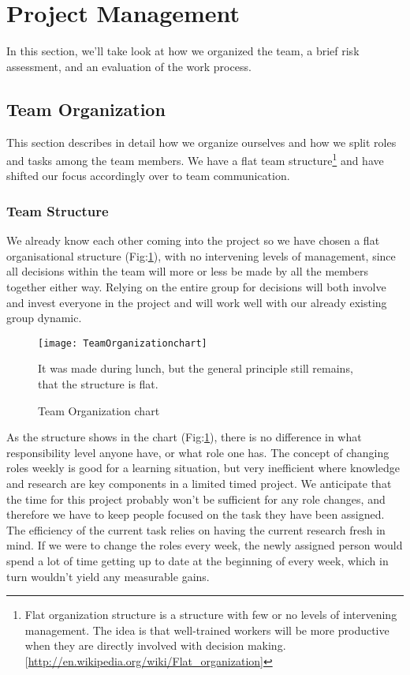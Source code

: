 \section{Project Management}\label{Project Management} 
    In this section, we'll take look at how we organized the team, a brief risk assessment, and an evaluation of the work process. 
    
    \subsection{Team Organization}\label{Team Organization} 
        This section describes in detail how we organize ourselves and how we split roles and tasks among the team members. We have a flat team structure\footnote{Flat organization structure is a structure with few or no levels of intervening management. The idea is that well-trained workers will be more productive when they are directly involved with decision making. [\url{http://en.wikipedia.org/wiki/Flat_organization}]}  and have shifted our focus accordingly over to team communication. 
    
    \subsubsection{Team Structure}\label{Team Structure}
    We already know each other coming into the project so we have chosen a flat organisational structure (Fig:\ref{fig:TeamOrganizationchart}), with no intervening levels of management, since all decisions within the team will more or less be made by all the members together either way. Relying on the entire group for decisions will both involve and invest everyone in the project and will work well with our already existing group dynamic.

    \begin{figure}[h]
        \centering
        \texttt{[image: TeamOrganizationchart]}
        \caption{Team Organization chart}
        It was made during lunch, but the general principle still remains, that the structure is flat.
        \label{fig:TeamOrganizationchart}
    \end{figure}
    
    As the structure shows in the chart (Fig:\ref{fig:TeamOrganizationchart}), there is no difference in what responsibility level anyone have, or what role one has. The concept of changing roles weekly is good for a learning situation, but very inefficient where knowledge and research are key components in a limited timed project. We anticipate that the time for this project probably won't be sufficient for any role changes, and therefore we have to keep people focused on the task they have been assigned. The efficiency of the current task relies on having the current research fresh in mind. If we were to change the roles every week, the newly assigned person would spend a lot of time getting up to date at the beginning of every week, which in turn wouldn't yield any measurable gains. 
    
